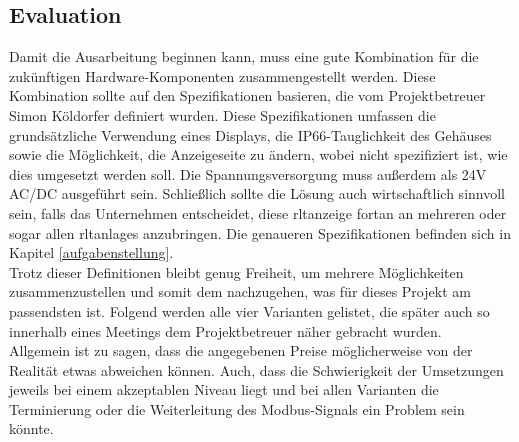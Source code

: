\subsection{Evaluation} \label{evaluierung}
Damit die Ausarbeitung beginnen kann, muss eine gute Kombination für die zukünftigen Hardware-Komponenten zusammengestellt werden. Diese Kombination sollte auf den Spezifikationen basieren, die vom Projektbetreuer Simon Köldorfer definiert wurden. Diese Spezifikationen umfassen die grundsätzliche Verwendung eines Displays, die IP66-Tauglichkeit des Gehäuses sowie die Möglichkeit, die Anzeigeseite zu ändern, wobei nicht spezifiziert ist, wie dies umgesetzt werden soll. Die Spannungsversorgung muss außerdem als 24V AC/DC ausgeführt sein. Schließlich sollte die Lösung auch wirtschaftlich sinnvoll sein, falls das Unternehmen entscheidet, diese \acs{rltanzeige} fortan an mehreren oder sogar allen \acsp{rltanlage} anzubringen. Die genaueren Spezifikationen befinden sich in Kapitel \ref{aufgabenstellung}.\\
Trotz dieser Definitionen bleibt genug Freiheit, um mehrere Möglichkeiten zusammenzustellen und somit dem nachzugehen, was für dieses Projekt am passendsten ist. 
Folgend werden alle vier Varianten gelistet, die später auch so innerhalb eines Meetings dem Projektbetreuer näher gebracht wurden. \\
Allgemein ist zu sagen, dass die angegebenen Preise möglicherweise von der Realität etwas abweichen können. Auch, dass die Schwierigkeit der Umsetzungen jeweils bei einem akzeptablen Niveau liegt und bei allen Varianten die Terminierung oder die Weiterleitung des Modbus-Signals ein Problem sein könnte.
